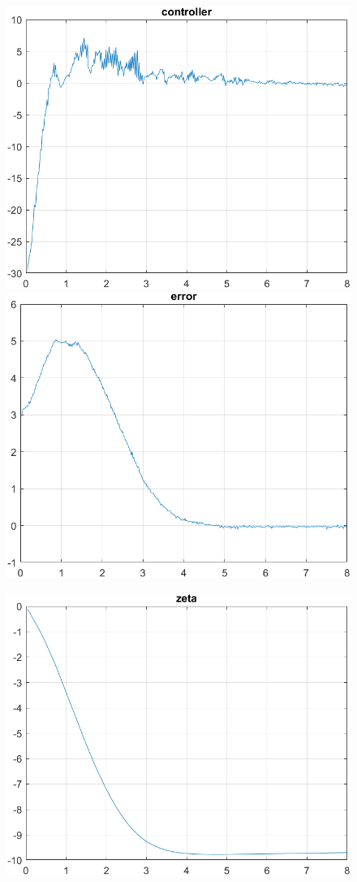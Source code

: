     \begin{figure}[H]
    \begin{minipage}{0.45\textwidth}
        \includegraphics[width=\linewidth]{Images/lab3/con32.png}
    \end{minipage}
    \hfill
    \begin{minipage}{0.45\textwidth}
        \includegraphics[width=\linewidth]{Images/lab3/err32.png}
    \end{minipage}
\end{figure}
\begin{figure}[H]
    \centering
    \includegraphics[width=0.5\linewidth]{Images/lab3/zet32.png}
\end{figure}
